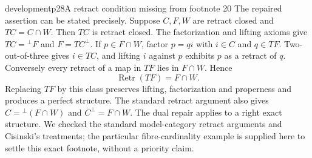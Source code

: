 \begin{dcomment}{development}{p28}{A retract condition missing from footnote 20}
The repaired assertion can be stated precisely. Suppose $C,F,W$ are retract closed and $TC=C\cap W$. Then $TC$ is retract closed. The factorization and lifting axioms give $TC={}^\perp F$ and $F=TC^\perp$. If $p\in F\cap W$, factor $p=qi$ with $i\in C$ and $q\in TF$. Two-out-of-three gives $i\in TC$, and lifting $i$ against $p$ exhibits $p$ as a retract of $q$. Conversely every retract of a map in $TF$ lies in $F\cap W$. Hence
\[
 \operatorname{Retr}(TF)=F\cap W.
\]
Replacing $TF$ by this class preserves lifting, factorization and properness and produces a perfect structure. The standard retract argument also gives $C={}^\perp(F\cap W)$ and $C^\perp=F\cap W$. The dual repair applies to a right exact structure. We checked the standard model-category retract arguments and Cisinski's treatments; the particular fibre-cardinality example is supplied here to settle this exact footnote, without a priority claim.
\end{dcomment}

